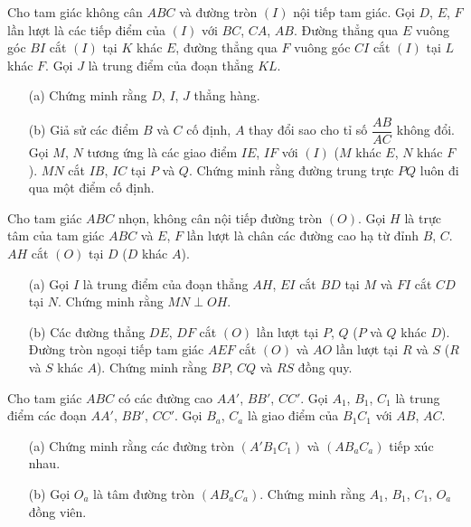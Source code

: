         \boom

        \begin{exercise}
            Cho tam giác không cân \(ABC\) và đường tròn \((I)\) nội tiếp tam giác. Gọi \(D\), \(E\), \(F\) lần lượt là các tiếp điểm của \((I)\) với \(BC\), \(CA\), \(AB\). Đường thẳng qua \(E\) vuông góc \(BI\) cắt \((I)\) tại \(K\) khác \(E\), đường thẳng qua \(F\) vuông góc \(CI\) cắt \((I)\) tại \(L\) khác \(F\). Gọi \(J\) là trung điểm của đoạn thẳng \(KL\).
            \begin{itemize}
                \item[(a)] Chứng minh rằng \(D\), \(I\), \(J\) thẳng hàng.
                \item[(b)] Giả sử các điểm \(B\) và \(C\) cố định, \(A\) thay đổi sao cho tỉ số \(\dfrac{AB}{AC}\) không đổi. Gọi \(M\), \(N\) tương ứng là các giao điểm \(IE\), \(IF\) với \((I)\) (\(M\) khác \(E\), \(N\) khác \(F\)). \(MN\) cắt \(IB\), \(IC\) tại \(P\) và \(Q\). Chứng minh rằng đường trung trực \(PQ\) luôn đi qua một điểm cố định.
            \end{itemize}
        \end{exercise}

        \boom

        \begin{exercise}
            Cho tam giác \(ABC\) nhọn, không cân nội tiếp đường tròn \((O)\). Gọi \(H\) là trực tâm của tam giác \(ABC\) và \(E\), \(F\) lần lượt là chân các đường cao hạ từ đỉnh \(B\), \(C\). \(AH\) cắt \((O)\) tại \(D\) (\(D\) khác \(A\)).
            \begin{itemize}
                \item[(a)] Gọi \(I\) là trung điểm của đoạn thẳng \(AH\), \(EI\) cắt \(BD\) tại \(M\) và \(FI\) cắt \(CD\) tại \(N\). Chứng minh rằng \(MN \perp OH\).
                \item[(b)] Các đường thẳng \(DE\), \(DF\) cắt \((O)\) lần lượt tại \(P\), \(Q\) (\(P\) và \(Q\) khác \(D\)). Đường tròn ngoại tiếp tam giác \(AEF\) cắt \((O)\) và \(AO\) lần lượt tại \(R\) và \(S\) (\(R\) và \(S\) khác \(A\)). Chứng minh rằng \(BP\), \(CQ\) và \(RS\) đồng quy.
            \end{itemize}
        \end{exercise}

        \boom

        \begin{exercise}
            Cho tam giác \(ABC\) có các đường cao \(AA'\), \(BB'\), \(CC'\). Gọi \(A_1\), \(B_1\), \(C_1\) là trung điểm các đoạn \(AA'\), \(BB'\), \(CC'\). Gọi \(B_a\), \(C_a\) là giao điểm của \(B_1C_1\) với \(AB\), \(AC\).
            \begin{enumerate}
                \item[(a)] Chứng minh rằng các đường tròn \((A'B_1C_1)\) và \((AB_aC_a)\) tiếp xúc nhau.
                \item[(b)] Gọi \(O_a\) là tâm đường tròn \((AB_aC_a)\). Chứng minh rằng \(A_1\), \(B_1\), \(C_1\), \(O_a\) đồng viên.
            \end{enumerate}
        \end{exercise}

